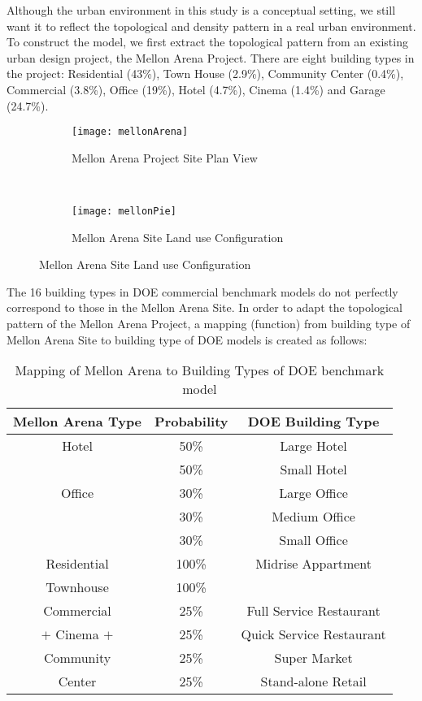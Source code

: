 \documentclass[hidelinks,12pt]{article}
\begin{document}
Although the urban environment in this study is a conceptual setting,
we still want it to reflect the topological and density pattern in a
real urban environment. To construct the model, we first extract the
topological pattern from an existing urban design project, the Mellon
Arena Project.
There are eight building types in the project: Residential (43\%),
Town House (2.9\%), Community Center (0.4\%), Commercial (3.8\%),
Office (19\%), Hotel (4.7\%), Cinema (1.4\%) and Garage (24.7\%).
\begin{figure}[h!]
  \centering
  \begin{subfigure}
  \centering
  \texttt{[image: mellonArena]}
  \caption{Mellon Arena Project Site Plan View}
  \label{fig:mellonArena}
\end{subfigure}
~
\begin{subfigure}
  \centering
  \texttt{[image: mellonPie]}
  \caption{Mellon Arena Site Land use Configuration}
  \label{fig:mellonPie}
\end{subfigure}
\end{figure}
The 16 building types in DOE commercial benchmark models do not
perfectly correspond to those in the Mellon Arena Site. In order to
adapt the topological pattern of the Mellon Arena Project, a mapping
(function) from building type of Mellon Arena Site to building type of
DOE models is created as follows:
\begin{table}[h!]
  \centering
  \begin{tabular}{c| c| c}
    \hline
    Mellon Arena Type &Probability &DOE Building Type\\
    \hline
    Hotel &50\%&Large Hotel\\
    \cline{2-3}
    &50\%&Small Hotel\\
    \hline
    Office &30\%&Large Office\\
    \cline{2-3}
    &30\%&Medium Office\\
    \cline{2-3}
    &30\%&Small Office\\
    \hline
    Residential &100\%&Midrise Appartment\\
    \cline{1-2}
    Townhouse &100\%&\\
    \hline
    Commercial &25\%&Full Service Restaurant\\
    \cline{2-3}
    $+$ Cinema $+$&25\%&Quick Service Restaurant\\
    \cline{2-3}
    Community &25\%&Super Market\\
    \cline{2-3}
    Center &25\%&Stand-alone Retail\\
    \hline
  \end{tabular}
  \caption{Mapping of Mellon Arena to Building Types of DOE benchmark model}
  \label{tab:typeMap}
\end{table}
\end{document}

